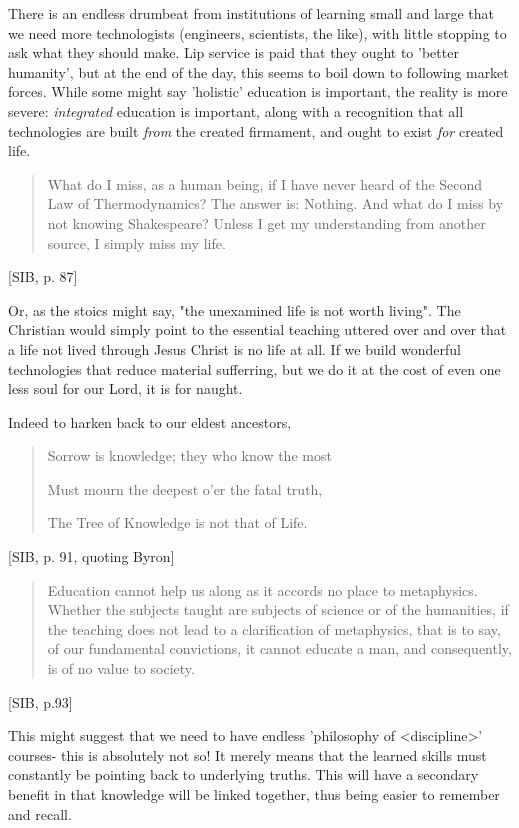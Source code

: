 \documentclass[letterpaper]{article}
\begin{document}
There is an endless drumbeat from institutions of learning small and large that we need more technologists (engineers, scientists, the like), with little stopping to ask what they should make. Lip service is paid that they ought to 'better humanity', but at the end of the day, this seems to boil down to following market forces. While some might say 'holistic' education is important, the reality is more severe: \textit{integrated} education is important, along with a recognition that all technologies are built \textit{from} the created firmament, and ought to exist \textit{for} created life.

\begin{quote}
What do I miss, as a human being, if I have never heard of the Second Law of Thermodynamics? The answer is: Nothing. And what do I miss by not knowing Shakespeare? Unless I get my understanding from another source, I simply miss my life.
\end{quote}[SIB, p. 87]

Or, as the stoics might say, "the unexamined life is not worth living". The Christian would simply point to the essential teaching uttered over and over that a life not lived through Jesus Christ is no life at all. If we build wonderful technologies that reduce material sufferring, but we do it at the cost of even one less soul for our Lord, it is for naught.

Indeed to harken back to our eldest ancestors,

\begin{quote}
  Sorrow is knowledge; they who know the most

  Must mourn the deepest o'er the fatal truth,

  The Tree of Knowledge is not that of Life.
\end{quote}[SIB, p. 91, quoting Byron]

\begin{quote}
  Education cannot help us along as it accords no place to metaphysics. Whether the subjects taught are subjects of science or of the humanities, if the teaching does not lead to a clarification of metaphysics, that is to say, of our fundamental convictions, it cannot educate a man, and consequently, is of no value to society.
\end{quote}[SIB, p.93]

This might suggest that we need to have endless 'philosophy of <discipline>' courses- this is absolutely not so! It merely means that the learned skills must constantly be pointing back to underlying truths. This will have a secondary benefit in that knowledge will be linked together, thus being easier to remember and recall.
\end{document}
